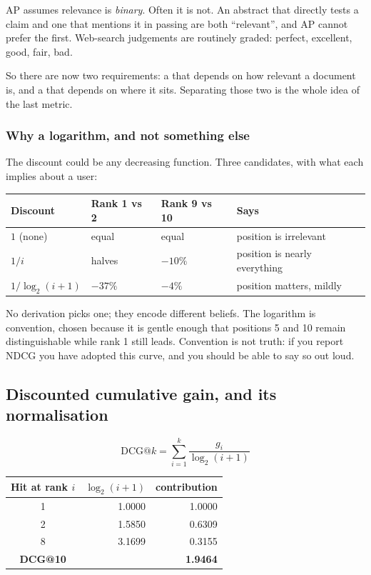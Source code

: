 \documentclass[11pt,a4paper]{article}
\begin{document}
AP assumes relevance is \emph{binary}. Often it is not. An abstract that
directly tests a claim and one that mentions it in passing are both
``relevant'', and AP cannot prefer the first. Web-search judgements are
routinely graded: perfect, excellent, good, fair, bad.

So there are now two requirements: a  that depends on how relevant a
document is, and a  that depends on where it sits. Separating
those two is the whole idea of the last metric.

\subsubsection{Why a logarithm, and not something else}

The discount could be any decreasing function. Three candidates, with what each
implies about a user:

\begin{center}
\small
\begin{tabular}{llll}
\toprule
\textbf{Discount} & \textbf{Rank 1 vs 2} & \textbf{Rank 9 vs 10} & \textbf{Says} \\
\midrule
$1$ (none)         & equal   & equal   & position is irrelevant \\
$1/i$              & halves  & $-10\%$ & position is nearly everything \\
$1/\log_2(i{+}1)$  & $-37\%$ & $-4\%$  & position matters, mildly \\
\bottomrule
\end{tabular}
\end{center}

No derivation picks one; they encode different beliefs. The logarithm is
convention, chosen because it is gentle enough that positions 5 and 10 remain
distinguishable while rank 1 still leads. Convention is not truth: if you
report NDCG you have adopted this curve, and you should be able to say so out
loud.

\subsection{Discounted cumulative gain, and its normalisation}

\[ \text{DCG}@k = \sum_{i=1}^{k} \frac{g_i}{\log_2(i+1)} \]

\begin{center}
\small
\begin{tabular}{crr}
\toprule
\textbf{Hit at rank $i$} & $\log_2(i+1)$ & \textbf{contribution} \\
\midrule
1 & 1.0000 & 1.0000 \\
2 & 1.5850 & 0.6309 \\
8 & 3.1699 & 0.3155 \\
\midrule
\textbf{DCG@10} & & \textbf{1.9464} \\
\bottomrule
\end{tabular}
\end{center}
\end{document}
